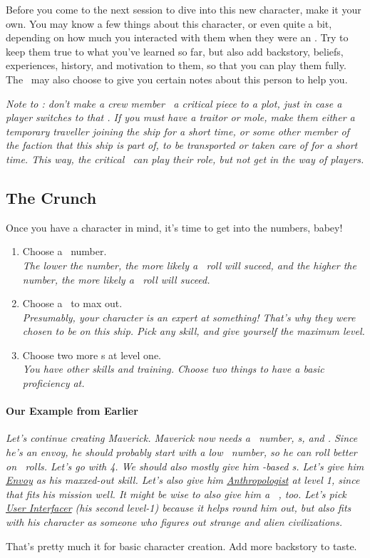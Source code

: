 \par
Before you come to the next session to dive into this new character, make it your own. You may know a few things about this character, or even quite a bit, depending on how much you interacted with them when they were an \npcShort. Try to keep them true to what you've learned so far, but also add backstory, beliefs, experiences, history, and motivation to them, so that you can play them fully. The \gm\, may also choose to give you certain notes about this person to help you.

\par
\textit{Note to \gm : don't make a crew member \npcShort\, a critical piece to a plot, just in case a player switches to that \npcShort . If you must have a traitor or mole, make them either a temporary traveller joining the ship for a short time, or some other member of the faction that this ship is part of, to be transported or taken care of for a short time. This way, the critical \npcShort\, can play their role, but not get in the way of players.}

\subsection{The Crunch}

\par
Once you have a character in mind, it's time to get into the numbers, babey!
\begin{enumerate}
	\item Choose a \both\, number. \\
		\textit{The lower the number, the more likely a \feelings\, roll will suceed, and the higher the number, the more likely a \lasers\, roll will suceed.}
	\item Choose a \skill\, to max out.\\
		\textit{Presumably, your character is an expert at something! That's why they were chosen to be on this ship. Pick any skill, and give yourself the maximum level.}
	\item Choose two more \skill s at level one. \\
		\textit{You have other skills and training. Choose two things to have a basic proficiency at.}
\end{enumerate}

\paragraph{Our Example from Earlier}
\textit{Let's continue creating Maverick. Maverick now needs a \both\, number, \skill s, and \abilityP . Since he's an envoy, he should probably start with a low \both\, number, so he can roll better on \feelings\, rolls. Let's go with 4. We should also mostly give him \feelings -based \skill s. Let's give him \hyperlink{SkillEnvoy}{Envoy} as his maxxed-out skill. Let's also give him \hyperlink{SkillAnthropologist}{Anthropologist} at level 1, since that fits his mission well. It might be wise to also give him a \lasers\, \skill , too. Let's pick \hyperlink{SkillUserInterfacer}{User Interfacer} (his second level-1) because it helps round him out, but also fits with his character as someone who figures out strange and alien civilizations.}

\par
That's pretty much it for basic character creation. Add more backstory to taste.